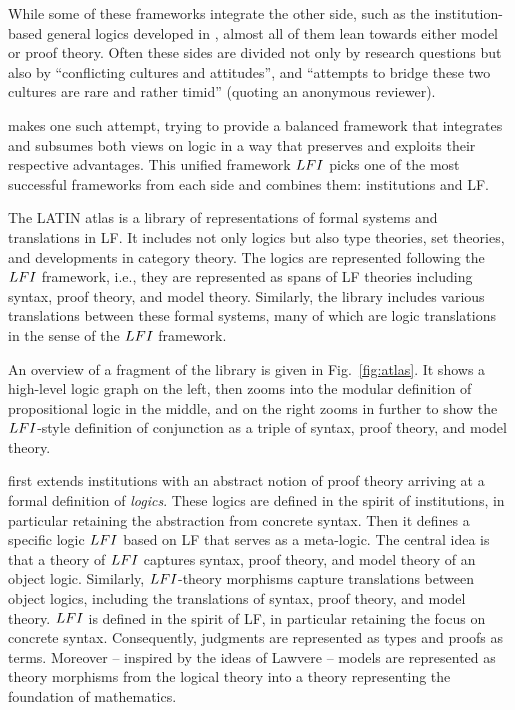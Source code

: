 While some of these frameworks integrate the other side, such as the institution-based general logics developed in \cite{generallogics}, almost all of them lean towards either model or proof theory. Often these sides are divided not only by research questions but also by ``conflicting cultures and attitudes'', and ``attempts to bridge these two cultures are rare and rather timid'' (quoting an anonymous reviewer).

 makes one such attempt, trying to provide a balanced framework that integrates and subsumes both views on logic in a way that preserves and exploits their respective advantages.
This unified framework $LFI$ picks one of the most successful frameworks from each side and combines them: institutions and LF.


The LATIN atlas is a library of representations of formal systems and translations in LF.
It includes not only logics but also type theories, set theories, and developments in category theory.
The logics are represented following the $LFI$ framework, i.e., they are represented as spans of LF theories including syntax, proof theory, and model theory.
Similarly, the library includes various translations between these formal systems, many of which are logic translations in the sense of the $LFI$ framework.

An overview of a fragment of the library is given in Fig.~\ref{fig:atlas}.
It shows a high-level logic graph on the left, then zooms into the modular definition of propositional logic in the middle, and on the right zooms in further to show the $LFI$-style definition of conjunction as a triple of syntax, proof theory, and model theory.
\medskip

 first extends institutions with an abstract notion of proof theory arriving at a formal definition of \emph{logics}.
These logics are defined in the spirit of institutions, in particular retaining the abstraction from concrete syntax.
Then it defines a specific logic $LFI$ based on LF that serves as a meta-logic.
The central idea is that a theory of $LFI$ captures syntax, proof theory, and model theory of an object logic.
Similarly, $LFI$-theory morphisms capture translations between object logics, including the translations of syntax, proof theory, and model theory.
$LFI$ is defined in the spirit of LF, in particular retaining the focus on concrete syntax.
Consequently, judgments are represented as types and proofs as terms.
Moreover -- inspired by the ideas of Lawvere \cite{lawvere} -- models are represented as theory morphisms from the logical theory into a theory representing the foundation of mathematics.

